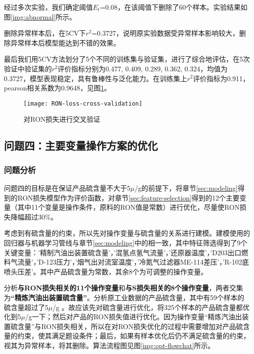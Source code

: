\documentclass[bwprint]{gmcmthesis}
\begin{document}
经过多次实验，我们确定阈值$E_t$=0.08，在该阈值下删除了60个样本。实验结果如图\ref{img:abnormal}所示。

删除异常样本后，在5CV下$r^2$=0.3727，说明原实验数据受异常样本影响较大，删除异常样本后模型能达到不错的效果。

最后我们用5CV方法划分了5个不同的训练集与验证集，进行了综合地评估，在5次验证中验证集的$r^2$评价指标分别为0.477, 0.409, 0.289, 0.362, 0.324，均值为0.3727，模型表现稳定，具有鲁棒性与泛化能力。在训练集上$r^2$评价指标为0.911，pearson相关系数为0.9648，见图\ref{RON-loss-cv}。

\begin{figure}[htb]
	\centering
	\texttt{[image: RON-loss-cross-validation]}
	\caption{对RON损失进行交叉验证}
	\label{RON-loss-cv}
\end{figure}



\FloatBarrier
\subsection{问题四：主要变量操作方案的优化}

\FloatBarrier
\subsubsection{问题分析}



问题四的目标是在保证产品硫含量不大于5$\mu$/g的前提下，将章节\ref{sec:modeling}得到的RON损失模型作为评价函数，对章节\ref{sec:feature-selection}得到的12个主要变量（其中11个变量是操作条件，原料的RON值是常数）进行优化，尽量使RON损失降幅超过30\%。


考虑到有硫含量的约束，所以先对操作变量与硫含量的关系进行建模。建模使用的回归器与机器学习管线与章节\ref{sec:modeling}中的相一致，其中特征筛选得到了9个关键变量：'精制汽油出装置硫含量'，'混氢点氢气流量'，'还原器温度'，'D203出口燃料气流量'，'D-123压力'，'烟气出对流室温度'，'冷氮气过滤器ME-114差压'，'R-102底喷头压差'。其中产品硫含量为常数，其余8个为可调整的操作变量。

分析\textbf{与RON损失相关的11个操作变量}和\textbf{与S损失相关的8个操作变量}，两者交集为\textbf{“精炼汽油出装置硫含量”}。分析原工业数据的产品硫含量，其中有59个样本的硫含量超过了5$\mu$/g 。故应该先对硫含量进行优化，将325个样本的产品硫含量都优化到5$\mu$/g一下；然后对产品的RON损失值进行优化。因为操作变量“精炼汽油出装置硫含量”与RON损失相关，所以在对RON损失优化的过程中需要增加对产品硫含量的约束，使其满足题设条件；最后，如果有样本优化后仍不满足硫含量的约束，视其为异常样本，将其删除。算法流程图见图\ref{img:opt-flowchat}所示。
\end{document}
